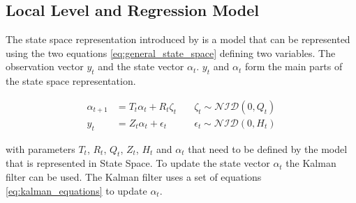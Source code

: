 \subsection{Local Level and Regression Model}
\label{subsec:state space}
The state space representation introduced by \cite{Kalman1960AProblems} is a model that can be represented using the two equations \eqref{eq:general_state_space} defining two variables. The observation vector $y_t$ and the state vector $\alpha_t$.  $y_t$ and $\alpha_t$ form the main parts of the state space representation.

\begin{equation}
\label{eq:general_state_space}
\begin{aligned}
\alpha_{t+1} &= T_t\alpha_t + R_t\zeta_t \quad &\zeta_t \sim \mathcal{NID}(0, Q_t)\\
    y_t &= Z_t\alpha_t + \epsilon_t \quad &\epsilon_t \sim \mathcal{NID}(0, H_t)
\end{aligned}
\end{equation}

with parameters $T_t$, $R_t$, $Q_t$, $Z_t$, $H_t$ and $\alpha_t$ that need to be defined by the model that is represented in State Space. To update the state vector $\alpha_t$ the Kalman filter \citep{Kalman1960AProblems} can be used. The Kalman filter uses a set of equations \eqref{eq:kalman_equations} to update $\alpha_t$.

